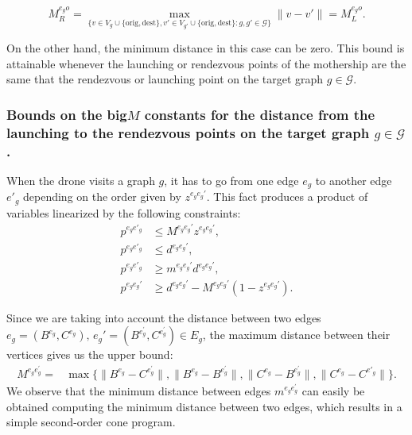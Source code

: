 \documentclass[10pt,a4paper]{elsarticle}
\newcommand{\EN}[1]{{\color{black}#1}}
\begin{document}
$$
M_R^{e_go} = \max_{\{v\in V_g\cup\{\text{orig}, \text{dest}\}, v'\in V_{g'}\cup\{\text{orig}, \text{dest}\} : g, g'\in\mathcal G\}} \|v - v'\| = M_L^{e_go}.
$$

\noindent
On the other hand, the minimum distance in this case can be zero. This bound is attainable whenever the launching or rendezvous points of the mothership are the same that the rendezvous or launching point on the target graph $g\in \mathcal{G}$.



\subsubsection*{Bounds on the big$M$ constants for the distance from the launching to the rendezvous points on the target graph $g\in \mathcal{G}$.} 
\noindent
When the drone visits a graph $g$, it has to go from one edge $e_g$ to another edge $e'_g$ depending on the order given by $z^{e_ge_g'}$. This fact produces a product of variables linearized by the following constraints:
\begin{align*}
p^{e_ge'_g} & \leq M^{e_ge_g'} z^{e_ge_g'}, \\
p^{e_ge'_g} & \leq d^{e_ge_g'}, \\
p^{e_ge'_g} & \geq m^{e_ge_g'} d^{e_ge_g'}, \\
p^{e_ge_g'} & \geq d^{e_ge_g'} - M^{e_ge_g'}(1-z^{e_ge_g'}).
\end{align*}

\noindent
Since we are taking into account the distance between two edges $e_g=(B^{e_g},C^{e_g}), \, e_g'=(B^{e^\prime_g},C^{e^\prime_g})\in E_g$, the maximum distance between their vertices gives us the upper bound:
\begin{align*}
M^{e_g e^\prime_g} = & \max\{\|B^{e_g} - C^{e^\prime_g}\|, \|B^{e_g} - B^{e^\prime_g}\|, \|C^{e_g} - B^{e^\prime_g}\|, \|C^{e_g} - C^{e'_g}\|\}. 
\end{align*}
We observe that the minimum distance between edges $m^{e_g e^\prime_g}$ can \EN{easily be} obtained computing the minimum distance between two edges, which results in a simple second-order cone program.
\end{document}
